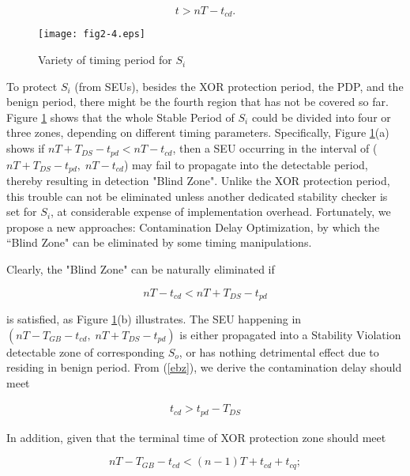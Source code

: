 \begin{equation}\label{benign}
t>nT-t_{cd}.
\end{equation}

\begin{figure}[ht]
\centering
\texttt{[image: fig2-4.eps]}
  \caption{Variety of timing period for $S_i$}\label{zones}
\end{figure}

To protect $S_i$ (from SEUs), besides the XOR protection period, the PDP, and the benign period, there might be the fourth region that has not be covered so far. Figure \ref{zones} shows that the whole Stable Period of $S_i$ could be divided into four or three zones, depending on different timing parameters. Specifically, Figure \ref{zones}(a) shows if $nT+T_{DS}-t_{pd}<nT-t_{cd}$, then a SEU occurring in the interval of ($nT+T_{DS}-t_{pd},\;nT-t_{cd}$)  may fail to propagate into the detectable period, thereby resulting in detection "Blind Zone". Unlike the XOR protection period, this trouble can not be eliminated unless another dedicated stability checker is set for $S_i$, at considerable expense of implementation overhead. Fortunately, we propose a new approaches: Contamination Delay Optimization, by which the ``Blind Zone" can be eliminated by some timing manipulations.

 Clearly, the "Blind Zone" can be naturally
eliminated if

\begin{equation}\label{ebz}
nT-t_{cd} < nT+T_{DS}-t_{pd}
\end{equation}

is satisfied, as Figure \ref{zones}(b) illustrates. The SEU happening in $(nT-T_{GB}-t_{cd}, \; nT+T_{DS}-t_{pd})$ is either propagated into a Stability Violation detectable zone of corresponding $S_o$, or has nothing detrimental effect due to residing in benign period. From (\ref{ebz}), we derive the contamination delay should meet 

\begin{eqnarray}\label{eq80}
 t_{cd} > t_{pd} - T_{DS}
\end{eqnarray}

In addition, given that the terminal time of XOR protection zone should meet

\begin{equation}
  nT-T_{GB}-t_{cd} < (n-1)T + t_{cd} + t_{cq}; \nonumber
\end{equation}


